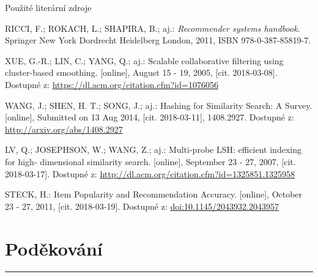 \documentclass[aspectratio=169,28pt]{beamer}
\begin{document}
\begin{frame}{Použité literární zdroje}
		\begin{thebibliography}{9}
\small

  \color{black}RICCI, F.; ROKACH, L.; SHAPIRA, B.; aj.: \textit{Recommender systems handbook.} Springer New York Dordrecht Heidelberg London, 2011, ISBN 978-0-387-85819-7.
  
  \color{black}XUE, G.-R.; LIN, C.; YANG, Q.; aj.: Scalable collaborative filtering using cluster-based smoothing. [online], August 15 - 19, 2005, [cit. 2018-03-08]. Dostupné z: \url{https://dl.acm.org/citation.cfm?id=1076056}
  
  \color{black}WANG, J.; SHEN, H. T.; SONG, J.; aj.: Hashing for Similarity Search: A Survey. [online], Submitted on 13 Aug 2014, [cit. 2018-03-11], 1408.2927. Dostupné z: \url{http://arxiv.org/abs/1408.2927}
  
  \color{black}LV, Q.; JOSEPHSON, W.; WANG, Z.; aj.: Multi-probe LSH: efficient indexing for high-
dimensional similarity search. [online], September 23 - 27, 2007, [cit. 2018-03-17]. Dostupné z: \url{http://dl.acm.org/citation.cfm?id=1325851.1325958}

  \color{black}STECK, H.: Item Popularity and Recommendation Accuracy. [online], October 23 - 27, 2011, [cit. 2018-03-19]. Dostupné z: \url{doi:10.1145/2043932.2043957}

\end{thebibliography}
		
\end{frame}

\section{Poděkování}

\begin{frame}
		\Huge{}
		\vskip 15pt
		{\color{blue}\rule[2pt]{0.8\textwidth}{2pt}}
		\color{black}\vskip 15pt
		\LARGE{}
\end{frame}
\end{document}
